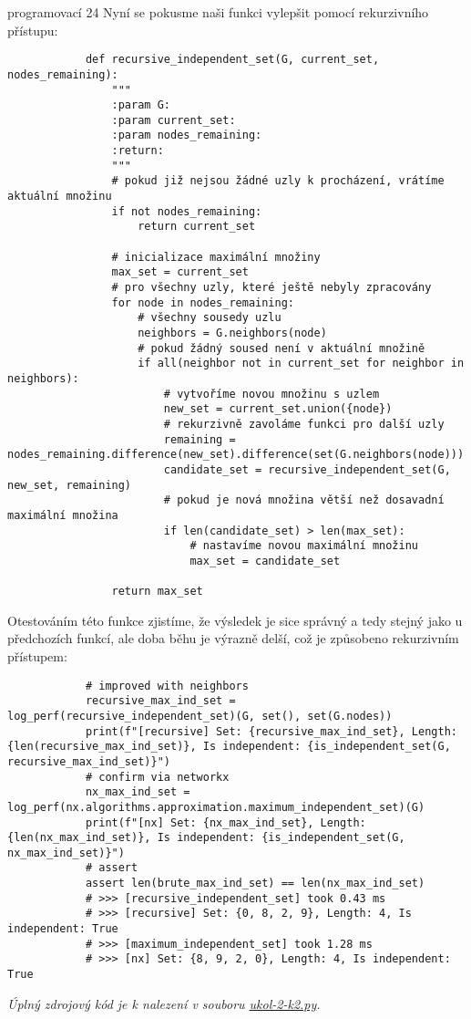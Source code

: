 \documentclass[10pt, a4paper]{ReportSheet}
\begin{document}
\begin{uloha}{programovací 2}{4}
        Nyní se pokusme naši funkci vylepšit pomocí rekurzivního přístupu:
        \begin{verbatim}
            def recursive_independent_set(G, current_set, nodes_remaining):
                """
                :param G:
                :param current_set:
                :param nodes_remaining:
                :return:
                """
                # pokud již nejsou žádné uzly k procházení, vrátíme aktuální množinu
                if not nodes_remaining:
                    return current_set

                # inicializace maximální množiny
                max_set = current_set
                # pro všechny uzly, které ještě nebyly zpracovány
                for node in nodes_remaining:
                    # všechny sousedy uzlu
                    neighbors = G.neighbors(node)
                    # pokud žádný soused není v aktuální množině
                    if all(neighbor not in current_set for neighbor in neighbors):
                        # vytvoříme novou množinu s uzlem
                        new_set = current_set.union({node})
                        # rekurzivně zavoláme funkci pro další uzly
                        remaining = nodes_remaining.difference(new_set).difference(set(G.neighbors(node)))
                        candidate_set = recursive_independent_set(G, new_set, remaining)
                        # pokud je nová množina větší než dosavadní maximální množina
                        if len(candidate_set) > len(max_set):
                            # nastavíme novou maximální množinu
                            max_set = candidate_set

                return max_set
        \end{verbatim}

        Otestováním této funkce zjistíme, že výsledek je sice správný a tedy stejný jako u předchozích funkcí, ale doba
        běhu je výrazně delší, což je způsobeno rekurzivním přístupem:
        \begin{verbatim}
            # improved with neighbors
            recursive_max_ind_set = log_perf(recursive_independent_set)(G, set(), set(G.nodes))
            print(f"[recursive] Set: {recursive_max_ind_set}, Length: {len(recursive_max_ind_set)}, Is independent: {is_independent_set(G, recursive_max_ind_set)}")
            # confirm via networkx
            nx_max_ind_set = log_perf(nx.algorithms.approximation.maximum_independent_set)(G)
            print(f"[nx] Set: {nx_max_ind_set}, Length: {len(nx_max_ind_set)}, Is independent: {is_independent_set(G, nx_max_ind_set)}")
            # assert
            assert len(brute_max_ind_set) == len(nx_max_ind_set)
            # >>> [recursive_independent_set] took 0.43 ms
            # >>> [recursive] Set: {0, 8, 2, 9}, Length: 4, Is independent: True
            # >>> [maximum_independent_set] took 1.28 ms
            # >>> [nx] Set: {8, 9, 2, 0}, Length: 4, Is independent: True
        \end{verbatim}

        \textit{
            Úplný zdrojový kód je k nalezení v souboru \href{https://github.com/filipditrich/MMAD-2024/blob/main/ukol-2-k2.py}{ukol-2-k2.py}.
        }
    \end{uloha}
\end{document}
